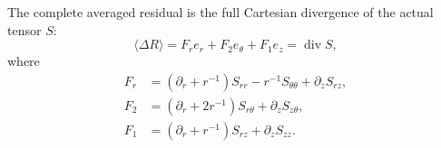 \begin{theorem}\label{mcstress:full_mean}
The complete averaged residual is the full Cartesian divergence of
the actual tensor $S$:
\begin{equation}\label{mcstress:Ffull}
 \langle\Delta R\rangle
 =F_r e_r+F_2e_\theta+F_1e_z
 =\operatorname{div}S,
\end{equation}
where
\begin{equation}\label{mcstress:all_components}
\begin{aligned}
 F_r&=(\partial_r+r^{-1})S_{rr}-r^{-1}S_{\theta\theta}
                                      +\partial_zS_{rz},\\
 F_2&=(\partial_r+2r^{-1})S_{r\theta}+\partial_zS_{z\theta},\\
 F_1&=(\partial_r+r^{-1})S_{rz}+\partial_zS_{zz}.
\end{aligned}
\end{equation}
\end{theorem}
